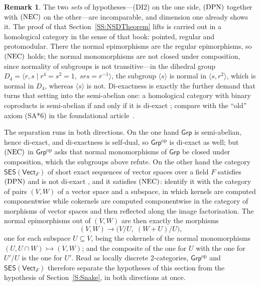 \documentclass[reqno,a4paper]{amsart}
\numberwithin{equation}{section}
\theoremstyle{plain}
\theoremstyle{definition}
\newtheorem{remark}[subsection]{Remark}
\newcommand{\onecat}[1]{\ensuremath{\mathsf{#1}}\xspace}
\renewcommand{\1}{\onecat{1}}
\newcommand{\Grp}{\onecat{Grp}}
\newcommand{\SES}{\onecat{SES}}
\newcommand{\VectF}{\ensuremath{\mathsf{Vect}_{F}}}
\newcommand{\DPN}{\textup{(DPN)}}
\newcommand{\NEC}{\textup{(NEC)}}
\newcommand{\op}{\ensuremath{^{\operatorname{op}}}}
\begin{document}
\begin{remark}\label{Rem NSD Discrete}
	The two \emph{sets} of hypotheses---\textup{(DI2)} on the one side, \(\DPN\) together with \(\NEC\) on the other---are incomparable, and dimension one already shows it. The proof of \cite{Borceux-Bourn} that Section~\ref{SS:NSDTheorem} lifts is carried out in a homological category in the sense of that book: pointed, regular and protomodular. There the normal epimorphisms are the regular epimorphisms, so \(\NEC\) holds; the normal monomorphisms are not closed under composition, since normality of subgroups is not transitive---in the dihedral group \(D_{4}=\langle r,s\mid r^{4}=s^{2}=1,\;srs=r^{-1}\rangle\), the subgroup \(\langle s\rangle\) is normal in \(\langle s,r^{2}\rangle\), which is normal in \(D_{4}\), whereas \(\langle s\rangle\) is not. Di-exactness is exactly the further demand that turns that setting into the semi-abelian one: a homological category with binary coproducts is semi-abelian if and only if it is di-exact \cite[Theorem~5.7.3 with Definition~5.1.1]{PVdL3}; compare with the ``old'' axiom (SA*6) in the foundational article~\cite{Janelidze-Marki-Tholen}.

	The separation runs in both directions. On the one hand \(\Grp\) is semi-abelian, hence di-exact, and di-exactness is self-dual, so \(\Grp\op\) is di-exact as well; but \(\NEC\) in \(\Grp\op\) asks that normal monomorphisms of \(\Grp\) be closed under composition, which the subgroups above refute. On the other hand the category \(\SES(\VectF)\) of short exact sequences of vector spaces over a field \(F\) satisfies \(\DPN\) and is not di-exact \cite[Example~4.3.8]{Afsa-24}, and it satisfies \(\NEC\): identify it with the category of pairs \((V,W)\) of a vector space and a subspace, in which kernels are computed componentwise while cokernels are computed componentwise in the category of morphisms of vector spaces and then reflected along the image factorisation. The normal epimorphisms out of \((V,W)\) are then exactly the morphisms
	\[
		(V,W)\longrightarrow\bigl(V/U,\;(W+U)/U\bigr)\text{,}
	\]
	one for each subspace \(U\subseteq V\), being the cokernels of the normal monomorphisms \((U,U\cap W)\rightarrowtail(V,W)\); and the composite of the one for \(U\) with the one for \(U'/U\) is the one for \(U'\). Read as locally discrete 2-categories, \(\Grp\op\) and \(\SES(\VectF)\) therefore separate the hypotheses of this section from the hypothesis of Section~\ref{S:Snake}, in both directions at once.
\end{remark}
\end{document}
